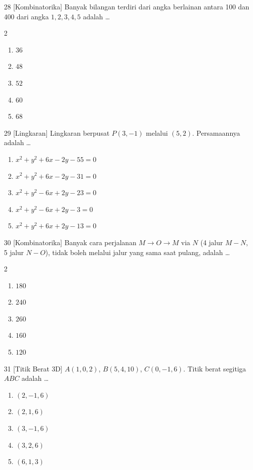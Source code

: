 \documentclass[11pt]{article}
\newenvironment{pil}{%
  \begin{enumerate}[label=(\alph*),leftmargin=*,itemsep=1pt,topsep=3pt]}%
  {\end{enumerate}}
\newenvironment{pilB}{%
  \par\smallskip\begin{multicols}{2}
  \begin{enumerate}[label=(\alph*),leftmargin=*,itemsep=1pt,topsep=3pt]}%
  {\end{enumerate}\end{multicols}}
\begin{document}
\begin{soal}{28 \normalfont\small[Kombinatorika]}
Banyak bilangan terdiri dari angka berlainan antara 100 dan 400 dari angka $1,2,3,4,5$ adalah \ldots
\begin{pilB}
  \item $36$ \item $48$ \item $52$ \item $60$ \item $68$
\end{pilB}
\end{soal}

\begin{soal}{29 \normalfont\small[Lingkaran]}
Lingkaran berpusat $P(3,-1)$ melalui $(5,2)$. Persamaannya adalah \ldots
\begin{pil}
  \item $x^2+y^2+6x-2y-55=0$ \item $x^2+y^2+6x-2y-31=0$
  \item $x^2+y^2-6x+2y-23=0$ \item $x^2+y^2-6x+2y-3=0$
  \item $x^2+y^2+6x+2y-13=0$
\end{pil}
\end{soal}

\begin{soal}{30 \normalfont\small[Kombinatorika]}
Banyak cara perjalanan $M\to O\to M$ via $N$ (4 jalur $M\!-\!N$, 5 jalur $N\!-\!O$), tidak boleh melalui jalur yang sama saat pulang, adalah \ldots
\begin{pilB}
  \item $180$ \item $240$ \item $260$ \item $160$ \item $120$
\end{pilB}
\end{soal}

\begin{soal}{31 \normalfont\small[Titik Berat 3D]}
$A(1,0,2)$, $B(5,4,10)$, $C(0,-1,6)$. Titik berat segitiga $ABC$ adalah \ldots
\begin{pil}
  \item $(2,-1,6)$ \item $(2,1,6)$ \item $(3,-1,6)$ \item $(3,2,6)$ \item $(6,1,3)$
\end{pil}
\end{soal}
\end{document}
